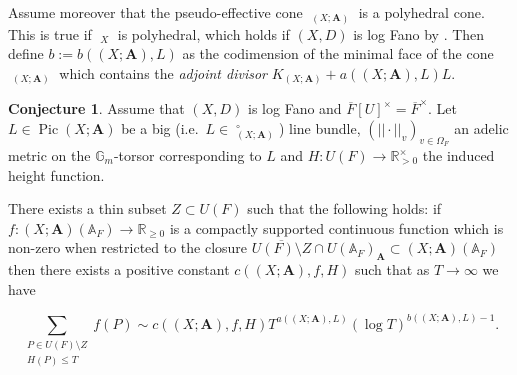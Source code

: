 \documentclass[a4paper,11pt,reqno]{amsart}
\newcommand{\R}{\mathbb{R}}
\newcommand{\G}{\mathbb{G}}
\newcommand{\A}{\mathbb{A}}
\DeclareMathOperator{\Pic}{Pic}
\DeclareMathOperator{\Eff}{\overline{Eff}}
\theoremstyle{definition}
\newtheorem{conjecture}[theorem]{Conjecture}
\begin{document}
Assume moreover that the pseudo-effective cone $\Eff_{(X ; \mathbf{A})}$ is a polyhedral cone. This is true if $\Eff_{X}$ is polyhedral, which holds if $(X, D)$ is log Fano by \cite[Cor.~1.3.5]{Birkar2010Minimal}. Then define $b := b((X ; \mathbf{A}), L)$ as the codimension of the minimal face of the cone $\Eff_{(X ; \mathbf{A})}$ which contains the \emph{adjoint divisor} $K_{(X; \mathbf{A})} + a((X ; \mathbf{A}), L) L$.
\begin{conjecture}\label{conj:Integral Manin conjecture}
	Assume that $(X, D)$ is log Fano and $\overline{F}[U]^{\times} = \overline{F}^{\times}$. Let $L \in \Pic (X ; \mathbf{A})$ be a big (i.e.~$L \in \Eff_{(X ; \mathbf{A})}^{\circ}$) line bundle, $(||\cdot||_v)_{v \in \Omega_F}$ an adelic metric on the $\G_m$-torsor corresponding to $L$ and $H: U(F) \to \R_{>0}^{\times}$ the induced height function.
	
	There exists a thin subset $Z \subset U(F)$ such that the following holds: if $f: (X; \mathbf{A})(\A_F) \to \R_{\geq 0}$ is a compactly supported continuous function which is non-zero when restricted to the closure $\overline{U(F) \setminus Z} \cap U(\A_F)_{\mathbf{A}} \subset (X; \mathbf{A})(\A_F)$ then there exists a positive constant $c((X ; \mathbf{A}), f,H)$ such that as $T \to \infty$ we have

	\begin{equation}
		\sum_{\substack{P \in U(F) \setminus Z \\ H(P) \leq T}} f(P) \sim c((X ; \mathbf{A}), f, H) T^{a((X ; \mathbf{A}), L)}(\log T)^{b((X ; \mathbf{A}), L) - 1}.
		\label{Integral Manin conjecture equation}
	\end{equation}
	\label{Integral Manin conjecture}
\end{conjecture}
\end{document}
